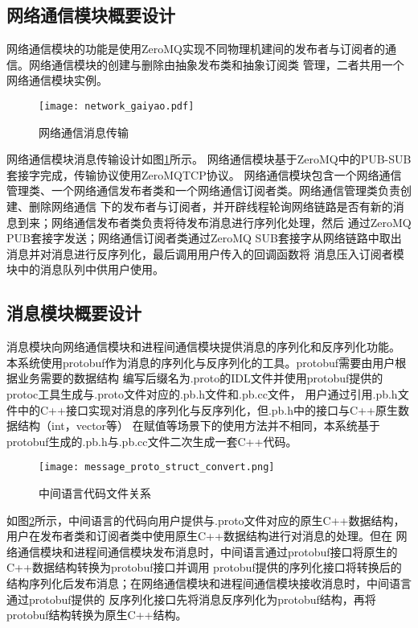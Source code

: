\subsection{网络通信模块概要设计}
网络通信模块的功能是使用ZeroMQ实现不同物理机建间的发布者与订阅者的通信。网络通信模块的创建与删除由抽象发布类和抽象订阅类
管理，二者共用一个网络通信模块实例。

\begin{figure}[H]
  \centering
  \texttt{[image: network\_gaiyao.pdf]}
  \caption{网络通信消息传输}
  \label{network_gaiyao}
\end{figure}

网络通信模块消息传输设计如图\ref{network_gaiyao}所示。
网络通信模块基于ZeroMQ中的PUB-SUB套接字完成，传输协议使用ZeroMQTCP协议。
网络通信模块包含一个网络通信管理类、一个网络通信发布者类和一个网络通信订阅者类。网络通信管理类负责创建、删除网络通信
下的发布者与订阅者，并开辟线程轮询网络链路是否有新的消息到来；网络通信发布者类负责将待发布消息进行序列化处理，然后
通过ZeroMQ PUB套接字发送；网络通信订阅者类通过ZeroMQ SUB套接字从网络链路中取出消息并对消息进行反序列化，最后调用用户传入的回调函数将
消息压入订阅者模块中的消息队列中供用户使用。

\subsection{消息模块概要设计}
消息模块向网络通信模块和进程间通信模块提供消息的序列化和反序列化功能。
本系统使用protobuf作为消息的序列化与反序列化的工具。protobuf需要由用户根据业务需要的数据结构
编写后缀名为.proto的IDL文件并使用protobuf提供的protoc工具生成与.proto文件对应的.pb.h文件和.pb.cc文件，
用户通过引用.pb.h文件中的C++接口实现对消息的序列化与反序列化，但.pb.h中的接口与C++原生数据结构（int，vector等）
在赋值等场景下的使用方法并不相同，本系统基于protobuf生成的.pb.h与.pb.cc文件二次生成一套C++代码。
\begin{figure}[H]
  \centering
  \texttt{[image: message\_proto\_struct\_convert.png]}
  \caption{中间语言代码文件关系}
  \label{proto-struct-convert}
\end{figure}

如图\ref{proto-struct-convert}所示，中间语言的代码向用户提供与.proto文件对应的原生C++数据结构，用户在发布者类和订阅者类中使用原生C++数据结构进行对消息的处理。但在
网络通信模块和进程间通信模块发布消息时，中间语言通过protobuf接口将原生的C++数据结构转换为protobuf接口并调用
protobuf提供的序列化接口将转换后的结构序列化后发布消息；在网络通信模块和进程间通信模块接收消息时，中间语言通过protobuf提供的
反序列化接口先将消息反序列化为protobuf结构，再将protobuf结构转换为原生C++结构。



